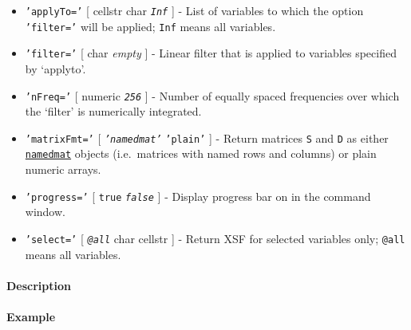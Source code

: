 \begin{itemize}
\item
  \texttt{'applyTo='} {[} cellstr \textbar{} char \textbar{}
  \emph{\texttt{Inf}} {]} - List of variables to which the option
  \texttt{'filter='} will be applied; \texttt{Inf} means all variables.
\item
  \texttt{'filter='} {[} char \textbar{} \emph{empty} {]} - Linear
  filter that is applied to variables specified by `applyto'.
\item
  \texttt{'nFreq='} {[} numeric \textbar{} \emph{\texttt{256}} {]} -
  Number of equally spaced frequencies over which the `filter' is
  numerically integrated.
\item
  \texttt{'matrixFmt='} {[} \emph{\texttt{'namedmat'}} \textbar{}
  \texttt{'plain'} {]} - Return matrices \texttt{S} and \texttt{D} as
  either \href{namedmat/Contents}{\texttt{namedmat}} objects
  (i.e.~matrices with named rows and columns) or plain numeric arrays.
\item
  \texttt{'progress='} {[} \texttt{true} \textbar{}
  \emph{\texttt{false}} {]} - Display progress bar on in the command
  window.
\item
  \texttt{'select='} {[} \emph{\texttt{@all}} \textbar{} char \textbar{}
  cellstr {]} - Return XSF for selected variables only; \texttt{@all}
  means all variables.
\end{itemize}

\paragraph{Description}\label{description}

\paragraph{Example}\label{example}


